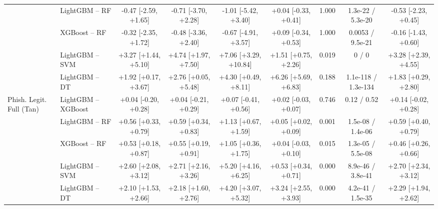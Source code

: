 \begin{tabular}{@{}llccccccc@{}}
 & LightGBM -- RF & -0.47 [-2.59, +1.65] & -0.71 [-3.70, +2.28] & -1.01 [-5.42, +3.40] & +0.04 [-0.33, +0.41] & 1.000 & 1.3e-22 / 5.3e-20 & -0.53 [-2.23, +0.45]\\
 & XGBoost -- RF & -0.32 [-2.35, +1.72] & -0.48 [-3.36, +2.40] & -0.67 [-4.91, +3.57] & +0.09 [-0.34, +0.53] & 1.000 & 0.0053 / 9.5e-21 & -0.16 [-1.43, +0.60]\\
 & LightGBM -- SVM & +3.27 [+1.44, +5.10] & +4.74 [+1.97, +7.50] & +7.06 [+3.29, +10.84] & +1.51 [+0.75, +2.26] & 0.019 & 0 / 0 & +3.28 [+2.39, +4.55]\\
 & LightGBM -- DT & +1.92 [+0.17, +3.67] & +2.76 [+0.05, +5.48] & +4.30 [+0.49, +8.11] & +6.26 [+5.69, +6.83] & 0.188 & 1.1e-118 / 1.3e-134 & +1.83 [+0.29, +2.80]\\
\midrule
Phish. Legit. Full (Tan) & LightGBM -- XGBoost & +0.04 [-0.20, +0.28] & +0.04 [-0.21, +0.29] & +0.07 [-0.41, +0.56] & +0.02 [-0.03, +0.07] & 0.746 & 0.12 / 0.52 & +0.14 [-0.02, +0.28]\\
 & LightGBM -- RF & +0.56 [+0.33, +0.79] & +0.59 [+0.34, +0.83] & +1.13 [+0.67, +1.59] & +0.05 [+0.02, +0.09] & 0.001 & 1.5e-08 / 1.4e-06 & +0.59 [+0.40, +0.79]\\
 & XGBoost -- RF & +0.53 [+0.18, +0.87] & +0.55 [+0.19, +0.91] & +1.05 [+0.36, +1.75] & +0.04 [-0.03, +0.10] & 0.015 & 1.3e-05 / 5.5e-08 & +0.46 [+0.26, +0.66]\\
 & LightGBM -- SVM & +2.60 [+2.08, +3.12] & +2.71 [+2.16, +3.26] & +5.20 [+4.16, +6.25] & +0.53 [+0.34, +0.71] & 0.000 & 8.9e-46 / 3.8e-41 & +2.70 [+2.34, +3.12]\\
 & LightGBM -- DT & +2.10 [+1.53, +2.66] & +2.18 [+1.60, +2.76] & +4.20 [+3.07, +5.32] & +3.24 [+2.55, +3.93] & 0.000 & 4.2e-41 / 1.5e-35 & +2.29 [+1.94, +2.62]\\
\bottomrule
\end{tabular}